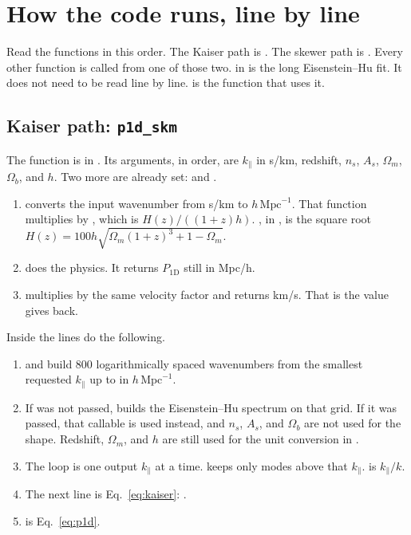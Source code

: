\documentclass[11pt]{article}
\begin{document}
\section{How the code runs, line by line}
\label{sec:linebyline}

Read the functions in this order. The Kaiser path is . The skewer path is . Every other function is called from one of those two.  in  is the long Eisenstein--Hu fit. It does not need to be read line by line.  is the function that uses it.

\subsection{Kaiser path: \texttt{p1d\_skm}}

The function is in . Its arguments, in order, are \(k_\parallel\) in s/km, redshift, \(n_s\), \(A_s\), \(\Omega_m\), \(\Omega_b\), and \(h\). Two more are already set:  and .

\begin{enumerate}
\item {} converts the input wavenumber from s/km to \(h\,\mathrm{Mpc}^{-1}\). That function multiplies by , which is \(H(z)/((1+z)h)\). , in , is the square root \(H(z)=100h\sqrt{\Omega_m(1+z)^3+1-\Omega_m}\).
\item {} does the physics. It returns \(P_{1\mathrm{D}}\) still in Mpc/h.
\item {} multiplies by the same velocity factor and returns km/s. That is the value  gives back.
\end{enumerate}

Inside  the lines do the following.

\begin{enumerate}
\item {} and  build 800 logarithmically spaced wavenumbers from the smallest requested \(k_\parallel\) up to  in \(h\,\mathrm{Mpc}^{-1}\).
\item If  was not passed,  builds the Eisenstein--Hu spectrum on that grid. If it was passed, that callable is used instead, and \(n_s\), \(A_s\), and \(\Omega_b\) are not used for the shape. Redshift, \(\Omega_m\), and \(h\) are still used for the unit conversion in .
\item The loop is one output \(k_\parallel\) at a time.  keeps only modes above that \(k_\parallel\).  is \(k_\parallel/k\).
\item The next line is Eq.~\eqref{eq:kaiser}: .
\item {} is Eq.~\eqref{eq:p1d}.
\end{enumerate}
\end{document}

